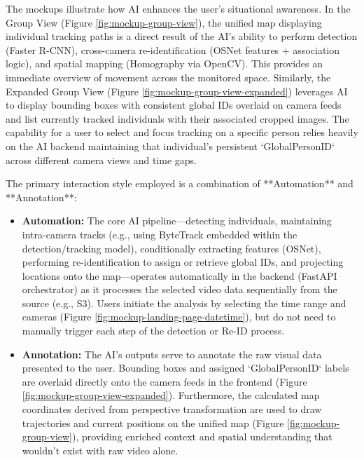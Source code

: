 The mockups illustrate how AI enhances the user's situational awareness. In the Group View (Figure \ref{fig:mockup-group-view}), the unified map displaying individual tracking paths is a direct result of the AI's ability to perform detection (Faster R-CNN), cross-camera re-identification (OSNet features + association logic), and spatial mapping (Homography via OpenCV). This provides an immediate overview of movement across the monitored space. Similarly, the Expanded Group View (Figure \ref{fig:mockup-group-view-expanded}) leverages AI to display bounding boxes with consistent global IDs overlaid on camera feeds and list currently tracked individuals with their associated cropped images. The capability for a user to select and focus tracking on a specific person relies heavily on the AI backend maintaining that individual's persistent `GlobalPersonID` across different camera views and time gaps.

The primary interaction style employed is a combination of **Automation** and **Annotation**:

\begin{itemize}
    \item \textbf{Automation:} The core AI pipeline—detecting individuals, maintaining intra-camera tracks (e.g., using ByteTrack embedded within the detection/tracking model), conditionally extracting features (OSNet), performing re-identification to assign or retrieve global IDs, and projecting locations onto the map—operates automatically in the backend (FastAPI orchestrator) as it processes the selected video data sequentially from the source (e.g., S3). Users initiate the analysis by selecting the time range and cameras (Figure \ref{fig:mockup-landing-page-datetime}), but do not need to manually trigger each step of the detection or Re-ID process.

    \item \textbf{Annotation:} The AI's outputs serve to annotate the raw visual data presented to the user. Bounding boxes and assigned `GlobalPersonID` labels are overlaid directly onto the camera feeds in the frontend (Figure \ref{fig:mockup-group-view-expanded}). Furthermore, the calculated map coordinates derived from perspective transformation are used to draw trajectories and current positions on the unified map (Figure \ref{fig:mockup-group-view}), providing enriched context and spatial understanding that wouldn't exist with raw video alone.
\end{itemize}

